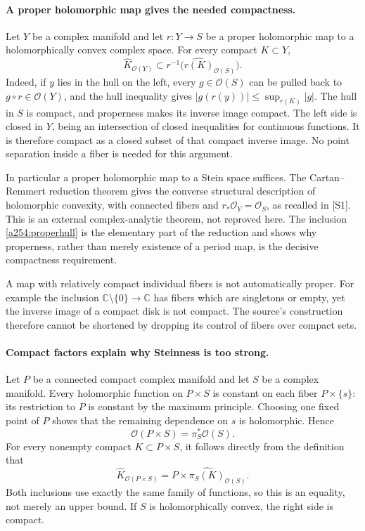 \documentclass[11pt]{article}
\begin{document}
\paragraph{A proper holomorphic map gives the needed compactness.}
Let $Y$ be a complex manifold and let $r:Y\to S$ be a proper
holomorphic map to a holomorphically convex complex space. For every
compact $K\subset Y$,
\begin{equation}\label{a254:properhull}
 \widehat K_{\mathcal O(Y)}
       \subset r^{-1}\bigl(\widehat{r(K)}_{\mathcal O(S)}\bigr).
\end{equation}
Indeed, if $y$ lies in the hull on the left, every $g\in\mathcal O(S)$
can be pulled back to $g\circ r\in\mathcal O(Y)$, and the hull
inequality gives $|g(r(y))|\le\sup_{r(K)}|g|$. The hull in $S$ is
compact, and properness makes its inverse image compact. The left side
is closed in $Y$, being an intersection of closed inequalities for
continuous functions. It is therefore compact as a closed subset of
that compact inverse image. No point separation inside a fiber is
needed for this argument.

In particular a proper holomorphic map to a Stein space suffices.
The Cartan--Remmert reduction theorem gives the converse structural
description of holomorphic convexity, with connected fibers and
$r_*\mathcal O_Y=\mathcal O_S$, as recalled in [S1]. This is an
external complex-analytic theorem, not reproved here. The inclusion
\eqref{a254:properhull} is the elementary part of the reduction and
shows why properness, rather than merely existence of a period map,
is the decisive compactness requirement.

A map with relatively compact individual fibers is not automatically
proper. For example the inclusion $\mathbb C\setminus\{0\}\to
\mathbb C$ has fibers which are singletons or empty, yet the inverse
image of a compact disk is not compact. The source's construction
therefore cannot be shortened by dropping its control of fibers over
compact sets.

\paragraph{Compact factors explain why Steinness is too strong.}
Let $P$ be a connected compact complex manifold and let $S$ be a
complex manifold. Every holomorphic function on $P\times S$ is
constant on each fiber $P\times\{s\}$: its restriction to $P$ is
constant by the maximum principle. Choosing one fixed point of $P$
shows that the remaining dependence on $s$ is holomorphic. Hence
\[
             \mathcal O(P\times S)=\pi_S^*\mathcal O(S).
\]
For every nonempty compact $K\subset P\times S$, it follows directly
from the definition that
\begin{equation}\label{a254:producthull}
 \widehat K_{\mathcal O(P\times S)}
       =P\times\widehat{\pi_S(K)}_{\mathcal O(S)}.
\end{equation}
Both inclusions use exactly the same family of functions, so this is
an equality, not merely an upper bound. If $S$ is holomorphically
convex, the right side is compact.
\end{document}
